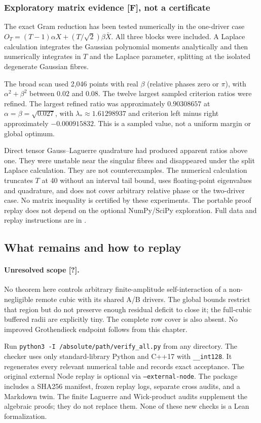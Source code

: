 \subsubsection{Exploratory matrix evidence [F], not a certificate}
The exact Gram reduction has been tested numerically in the one-driver case
$O_T=(T-1)\alpha X+(T/\sqrt2)\beta\bar X$.
All three blocks were included. A Laplace calculation integrates the Gaussian
polynomial moments analytically and then numerically integrates in $T$ and
the Laplace parameter, splitting at the isolated degenerate Gaussian fibres.

The broad scan used 2,046 points with real $\beta$ (relative phases zero or
$\pi$), with $\alpha^2+\beta^2$ between $0.02$ and $0.08$. The twelve
largest sampled criterion ratios were refined. The largest refined ratio was
approximately $0.90308657$ at $\alpha=\beta=\sqrt{0.027}$, with
$\lambda_*\approx1.61298937$ and criterion left minus right approximately
$-0.000915832$. This is a sampled value, not a uniform margin or global optimum.

Direct tensor Gauss--Laguerre quadrature had produced apparent ratios above
one. They were unstable near the singular fibres and disappeared under the
split Laplace calculation. They are not counterexamples.
The numerical calculation truncates $T$ at 40 without an interval tail bound,
uses floating-point eigenvalues and quadrature, and does not cover arbitrary
relative phase or the two-driver case. No matrix inequality is certified by
these experiments. The portable proof replay does not depend on the optional
NumPy/SciPy exploration. Full data and replay instructions are in
.

\subsection{What remains and how to replay}
\paragraph{Unresolved scope [?].}
No theorem here controls arbitrary finite-amplitude self-interaction of a
non-negligible remote cubic with its shared A/B drivers. The global bounds
restrict that region but do not preserve enough residual deficit to close it;
the full-cubic buffered radii are explicitly tiny. The complete row cover is
also absent. No improved Grothendieck endpoint follows from this chapter.

Run \texttt{python3 -I /absolute/path/verify\_all.py} from any directory.
The checker uses only standard-library Python and C++17 with
\texttt{\_\_int128}. It regenerates every relevant numerical table and
records exact acceptance. The original external Node replay is optional
via \texttt{--external-node}. The package includes a SHA256 manifest,
frozen replay logs, separate cross audits, and a Markdown twin.
The finite Laguerre and Wick-product audits supplement the algebraic proofs;
they do not replace them. None of these new checks is a Lean formalization.
